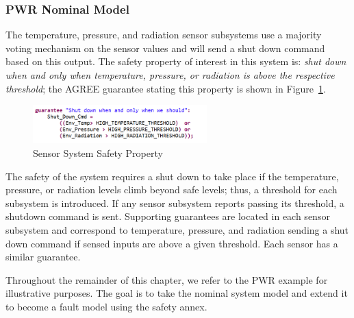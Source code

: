 \subsubsection{PWR Nominal Model}
The temperature, pressure, and radiation sensor subsystems use a majority voting mechanism on the sensor values and will send a shut down command based on this output. The safety property of interest in this system is: \emph{shut down when and only when temperature, pressure, or radiation is above the respective threshold}; the AGREE guarantee stating this property is shown in Figure~\ref{fig:shutdownGuar}. 

\begin{figure}[h!]
	\begin{center}
		\includegraphics[width=0.6\textwidth]{images/sensorGuar.PNG}
	\end{center}
	\vspace{-2em}
	\caption{Sensor System Safety Property}
	\label{fig:shutdownGuar}
\end{figure}

The safety of the system requires a shut down to take place if the temperature, pressure, or radiation levels climb beyond safe levels; thus, a threshold for each subsystem is introduced. If any sensor subsystem reports passing its threshold, a shutdown command is sent. Supporting guarantees are located in each sensor subsystem and correspond to temperature, pressure, and radiation sending a shut down command if sensed inputs are above a given threshold. Each sensor has a similar guarantee. 

Throughout the remainder of this chapter, we refer to the PWR example for illustrative purposes. The goal is to take the nominal system model and extend it to become a fault model using the safety annex. 